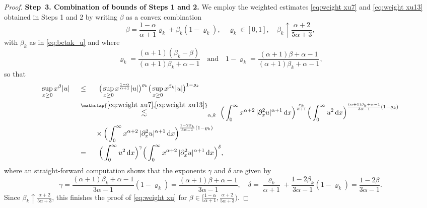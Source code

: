 \documentclass[reqno,12pt]{amsart}
\renewcommand{\d}{\ensuremath{\mathrm{d}}}
\renewcommand{\d}{\ensuremath{{\rm d}}}
\numberwithin{equation}{section}
\begin{document}
\begin{proof}
%
\bigskip
%

\noindent\textbf{Step~3. Combination of bounds of Steps 1 and 2.}
%
We employ the weighted estimates \eqref{eq:weight xu7} and \eqref{eq:weight xu13} obtained in Steps 1 and 2
by writing $\beta$ as a convex combination
%
\[
\beta = \frac{1-\alpha}{\alpha+1} \varrho_k + \beta_k (1-\varrho_k), \quad \varrho_k \in [0,1], \quad \beta_k \uparrow \frac{\alpha +2}{5\alpha+3},
\]
%
with $\beta_k$ as in \eqref{eq:betak_u} and where
%
\[
\varrho_k = \frac{(\alpha+1) (\beta_k-\beta)}{(\alpha+1)\beta_k+\alpha-1} \quad \text{and} \quad 1-\varrho_k = \frac{(\alpha+1)\beta+\alpha-1}{(\alpha+1)\beta_k+\alpha-1},
\]
%
so that
%
\begin{align*}
\sup_{x \ge 0} x^{\beta} |u| \; \quad &\le_{\phantom{\alpha,k}} \; \big(\sup_{x \ge 0} x^{\frac{1-\alpha}{\alpha+1}} |u|\big)^{\varrho_k} \big(\sup_{x \ge 0} x^{\beta_k} |u|\big)^{1-\varrho_k} \\
&\stackrel{\mathclap{\eqref{eq:weight xu7}, \eqref{eq:weight xu13}}}{\lesssim}_{\alpha,k} \; \Big(\int_0^\infty  x^{\alpha+2} \, |\partial_x^2 u|^{\alpha+1} \, \d x\Big)^{\frac{\varrho_k}{\alpha +1}} \Big( \int_0^\infty  u^{2} \, \d x \Big)^{\frac{(\alpha+1) \beta_k+\alpha-1}{3\alpha-1} (1-\varrho_k)}
\\
&\phantom{\lesssim_{\alpha,k}} \; \times 
\Big(\int_0^\infty  x^{\alpha+2} \, |\partial_x^2 u|^{\alpha+1} \, \d x\Big)^{\frac{1-2\beta_k}{3\alpha-1} (1-\varrho_k)} \\
&=_{\phantom{\alpha,k}} \; \Big(\int_0^\infty   u^{2} \, \d x\Big)^{\gamma}  \Big(\int_0^\infty x^{\alpha+2} \, |\partial_x^2 u|^{\alpha+1} \, \d x\Big)^{\delta}, %
\end{align*}
%
where an straight-forward computation shows that the exponents \(\gamma\) and \(\delta\) are given by
%
\begin{equation*}%
\gamma =\frac{(\alpha+1) \beta_k+\alpha-1}{3\alpha-1} (1-\varrho_k) = \frac{(\alpha +1)\beta+\alpha-1}{3\alpha -1}, \quad \delta = \frac{\varrho_k}{\alpha+1} + \frac{1-2\beta_k}{3\alpha-1} (1-\varrho_k)= \frac{1-2\beta}{3\alpha -1}.
\end{equation*}
%
Since $\beta_k \uparrow \frac{\alpha+2}{5\alpha+3}$, this finishes the proof of \eqref{eq:weight xu} for \(\beta \in \big[\frac{1-\alpha}{\alpha +1}, \frac{\alpha+2}{5\alpha +3}\big)\).

%
\bigskip
%


\end{proof}
\end{document}
